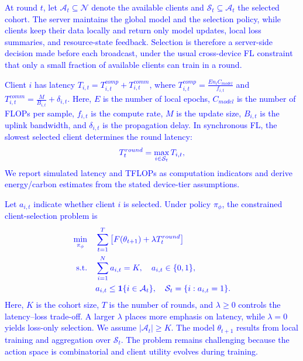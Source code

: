 \documentclass[journal]{IEEEtran}
\newcommand{\revision}[1]{\textcolor{blue}{#1}}
\begin{document}
\revision{At round $t$, let $\mathcal{A}_t \subseteq \mathcal{N}$ denote the available clients and $\mathcal{S}_t \subseteq \mathcal{A}_t$ the selected cohort. The server maintains the global model and the selection policy, while clients keep their data locally and return only model updates, local loss summaries, and resource-state feedback. Selection is therefore a server-side decision made before each broadcast, under the usual cross-device FL constraint that only a small fraction of available clients can train in a round.}

\revision{Client $i$ has latency $T_{i,t}=T_{i,t}^{comp}+T_{i,t}^{comm}$, where $T_{i,t}^{comp} = \frac{E n_i C_{model}}{f_{i,t}}$ and $T_{i,t}^{comm} = \frac{M}{B_{i,t}} + \delta_{i,t}$. Here, $E$ is the number of local epochs, $C_{model}$ is the number of FLOPs per sample, $f_{i,t}$ is the compute rate, $M$ is the update size, $B_{i,t}$ is the uplink bandwidth, and $\delta_{i,t}$ is the propagation delay. In synchronous FL, the slowest selected client determines the round latency:}
\begin{equation}
	\color{blue}
	T_t^{round} = \max_{i \in \mathcal{S}_t} T_{i,t},
	\label{eq:round_latency}
\end{equation}
\revision{We report simulated latency and TFLOPs as computation indicators and derive energy/carbon estimates from the stated device-tier assumptions.}

\revision{Let $a_{i,t}$ indicate whether client $i$ is selected. Under policy $\pi_\phi$, the constrained client-selection problem is}
\begin{equation}
	\color{blue}
	\begin{aligned}
		\min_{\pi_\phi}\quad & \sum_{t=1}^{T} \left[F(\theta_{t+1}) + \lambda T_t^{round}\right] \\
		\text{s.t.}\quad & \sum_{i=1}^{N} a_{i,t}=K,\quad a_{i,t}\in\{0,1\}, \\
		& a_{i,t}\leq \mathbf{1}\{i\in\mathcal{A}_t\},\quad
		\mathcal{S}_t=\{i:a_{i,t}=1\}.
	\end{aligned}
	\label{eq:bi_objective}
\end{equation}
\revision{Here, $K$ is the cohort size, $T$ is the number of rounds, and $\lambda \geq 0$ controls the latency--loss trade-off. A larger $\lambda$ places more emphasis on latency, while $\lambda=0$ yields loss-only selection. We assume $|\mathcal{A}_t|\geq K$. The model $\theta_{t+1}$ results from local training and aggregation over $\mathcal{S}_t$. The problem remains challenging because the action space is combinatorial and client utility evolves during training.}
\end{document}
